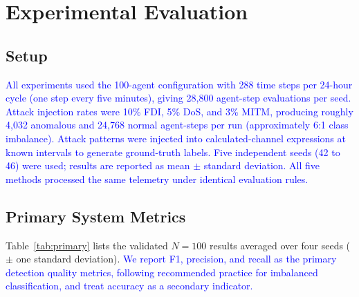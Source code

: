\documentclass[conference,a4paper]{IEEEtran}
\begin{document}
\section{Experimental Evaluation}

\subsection{Setup}

\textcolor{blue}{All experiments used the 100-agent configuration with 288 time steps per 24-hour cycle (one step every five minutes), giving 28,800 agent-step evaluations per seed. Attack injection rates were 10\% FDI, 5\% DoS, and 3\% MITM, producing roughly 4,032 anomalous and 24,768 normal agent-steps per run (approximately 6:1 class imbalance). Attack patterns were injected into calculated-channel expressions at known intervals to generate ground-truth labels. Five independent seeds (42 to 46) were used; results are reported as mean $\pm$ standard deviation. All five methods processed the same telemetry under identical evaluation rules.}

\subsection{Primary System Metrics}

Table~\ref{tab:primary} lists the validated $N=100$ results averaged over four seeds ($\pm$ one standard deviation). \textcolor{blue}{We report F1, precision, and recall as the primary detection quality metrics, following recommended practice for imbalanced classification, and treat accuracy as a secondary indicator.}
\end{document}
